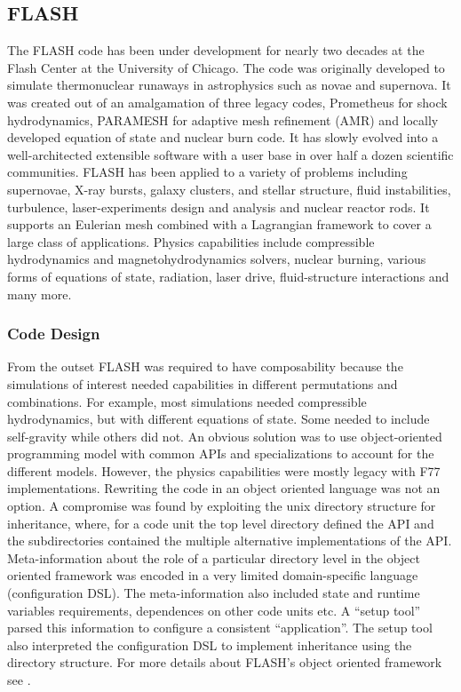 \subsection{FLASH}
The FLASH code \cite{FLASH,Dubey2009}  has been under development for nearly two decades at the
Flash Center at the University of Chicago. The code was originally
developed to simulate thermonuclear runaways in astrophysics such as
novae and supernova. It was created out of an amalgamation of three
legacy codes, Prometheus for 
shock hydrodynamics, PARAMESH for adaptive mesh refinement (AMR) and
locally developed equation of state and nuclear burn code. It has
slowly evolved into a well-architected extensible software with a user
base in over half a dozen scientific communities. FLASH has been
applied to a variety of problems including supernovae, X-ray bursts,
galaxy clusters, and stellar structure, fluid instabilities,
turbulence, laser-experiments design and analysis and nuclear reactor
rods. It supports an Eulerian mesh combined with a Lagrangian
framework to cover a large class of applications. Physics capabilities
include compressible hydrodynamics and magnetohydrodynamics solvers,
nuclear burning, various forms of equations of state, radiation, laser
drive, fluid-structure interactions and many more.   

\subsubsection{Code Design}
\label{sec:FLASHdesign}

From the outset FLASH was required to have composability because the
simulations of interest needed capabilities in different permutations
and combinations. For example, most simulations needed compressible
hydrodynamics, but with different equations of state. Some needed to
include self-gravity while others did not. An 
obvious solution was to use object-oriented programming model with
common APIs and specializations to account for the different
models. However, the physics capabilities were mostly legacy with F77
implementations. Rewriting the code in an object oriented language was
not an option. A compromise was found by exploiting the unix directory
structure for inheritance, where, for a code unit the top level
directory defined the API and the subdirectories contained the
multiple alternative implementations of the API.  Meta-information
about the role of a particular directory level in the object oriented framework
was encoded in a very limited domain-specific language (configuration
DSL). The meta-information also included state and runtime variables
requirements, dependences on other code units etc. A ``setup tool''
parsed this information to configure a consistent ``application''. The
setup tool also interpreted the configuration DSL to implement 
inheritance using the directory structure. For more details about
FLASH's object oriented framework see \cite{Dubey2009}.   

